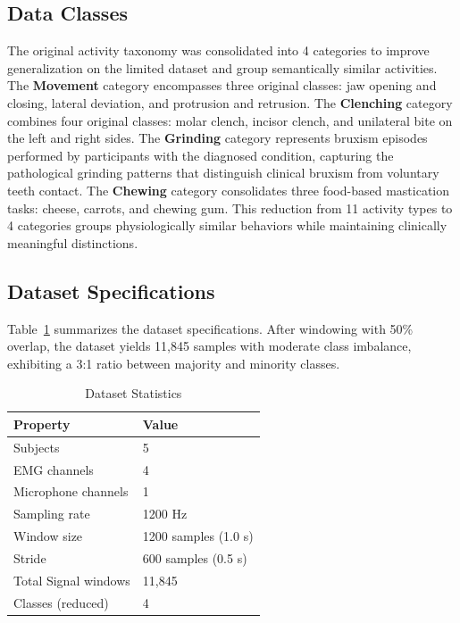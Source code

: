 \documentclass[acmtog, nonacm]{acmart}
\begin{document}
\subsection{Data Classes}

The original activity taxonomy was consolidated into 4 categories to improve generalization on the limited dataset and group semantically similar activities. The \textbf{Movement} category encompasses three original classes: jaw opening and closing, lateral deviation, and protrusion and retrusion. The \textbf{Clenching} category combines four original classes: molar clench, incisor clench, and unilateral bite on the left and right sides. The \textbf{Grinding} category represents bruxism episodes performed by participants with the diagnosed condition, capturing the pathological grinding patterns that distinguish clinical bruxism from voluntary teeth contact. The \textbf{Chewing} category consolidates three food-based mastication tasks: cheese, carrots, and chewing gum. This reduction from 11 activity types to 4 categories groups physiologically similar behaviors while maintaining clinically meaningful distinctions.

\subsection{Dataset Specifications}

Table~\ref{tab:dataset} summarizes the dataset specifications. After windowing with 50\% overlap, the dataset yields 11,845 samples with moderate class imbalance, exhibiting a 3:1 ratio between majority and minority classes.

\begin{table}[h]
  \caption{Dataset Statistics}
  \label{tab:dataset}
  \begin{tabular*}{\columnwidth}{@{\extracolsep{\fill}}ll@{}}
    \toprule
    Property & Value \\
    \midrule
    Subjects & 5 \\
    EMG channels & 4 \\
    Microphone channels & 1 \\
    Sampling rate & 1200 Hz \\
    Window size & 1200 samples (1.0 s) \\
    Stride & 600 samples (0.5 s) \\
    Total Signal windows & 11,845 \\
    Classes (reduced) & 4 \\
    \bottomrule
  \end{tabular*}
\end{table}
\end{document}
